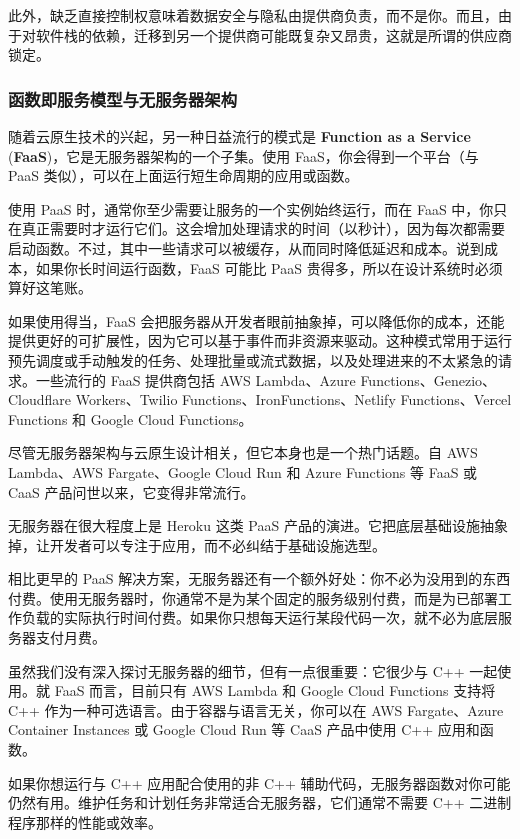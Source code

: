 此外，缺乏直接控制权意味着数据安全与隐私由提供商负责，而不是你。而且，由于对软件栈的依赖，迁移到另一个提供商可能既复杂又昂贵，这就是所谓的供应商锁定。

\subsubsection{函数即服务模型与无服务器架构}

\label{idx:279}
\label{idx:280}
随着云原生技术的兴起，另一种日益流行的模式是 \textbf{Function as a Service }(\textbf{FaaS})，它是无服务器架构的一个子集。使用 FaaS，你会得到一个平台（与 PaaS 类似），可以在上面运行短生命周期的应用或函数。

使用 PaaS 时，通常你至少需要让服务的一个实例始终运行，而在 FaaS 中，你只在真正需要时才运行它们。这会增加处理请求的时间（以秒计），因为每次都需要启动函数。不过，其中一些请求可以被缓存，从而同时降低延迟和成本。说到成本，如果你长时间运行函数，FaaS 可能比 PaaS 贵得多，所以在设计系统时必须算好这笔账。

如果使用得当，FaaS 会把服务器从开发者眼前抽象掉，可以降低你的成本，还能提供更好的可扩展性，因为它可以基于事件而非资源来驱动。这种模式常用于运行预先调度或手动触发的任务、处理批量或流式数据，以及处理进来的不太紧急的请求。一些流行的 FaaS 提供商包括 AWS Lambda、Azure Functions、Genezio、Cloudflare Workers、Twilio Functions、IronFunctions、Netlify Functions、Vercel Functions 和 Google Cloud Functions。

尽管无服务器架构与云原生设计相关，但它本身也是一个热门话题。自 AWS Lambda、AWS Fargate、Google Cloud Run 和 Azure Functions 等 FaaS 或 CaaS 产品问世以来，它变得非常流行。

\label{idx:281}
无服务器在很大程度上是 Heroku 这类 PaaS 产品的演进。它把底层基础设施抽象掉，让开发者可以专注于应用，而不必纠结于基础设施选型。

\label{idx:282}
相比更早的 PaaS 解决方案，无服务器还有一个额外好处：你不必为没用到的东西付费。使用无服务器时，你通常不是为某个固定的服务级别付费，而是为已部署工作负载的实际执行时间付费。如果你只想每天运行某段代码一次，就不必为底层服务器支付月费。

虽然我们没有深入探讨无服务器的细节，但有一点很重要：它很少与 C++ 一起使用。就 FaaS 而言，目前只有 AWS Lambda 和 Google Cloud Functions 支持将 C++ 作为一种可选语言。由于容器与语言无关，你可以在 AWS Fargate、Azure Container Instances 或 Google Cloud Run 等 CaaS 产品中使用 C++ 应用和函数。

如果你想运行与 C++ 应用配合使用的非 C++ 辅助代码，无服务器函数对你可能仍然有用。维护任务和计划任务非常适合无服务器，它们通常不需要 C++ 二进制程序那样的性能或效率。


